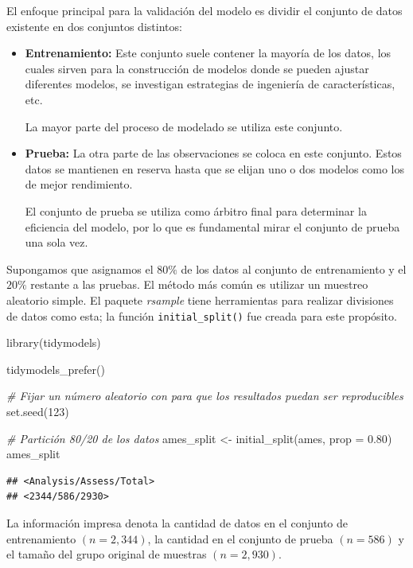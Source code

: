 \documentclass[
]{book}
\newenvironment{Shaded}{\begin{snugshade}}{\end{snugshade}}
\newcommand{\AttributeTok}[1]{\textcolor[rgb]{0.77,0.63,0.00}{#1}}
\newcommand{\CommentTok}[1]{\textcolor[rgb]{0.56,0.35,0.01}{\textit{#1}}}
\newcommand{\DecValTok}[1]{\textcolor[rgb]{0.00,0.00,0.81}{#1}}
\newcommand{\FloatTok}[1]{\textcolor[rgb]{0.00,0.00,0.81}{#1}}
\newcommand{\FunctionTok}[1]{\textcolor[rgb]{0.00,0.00,0.00}{#1}}
\newcommand{\NormalTok}[1]{#1}
\newcommand{\OtherTok}[1]{\textcolor[rgb]{0.56,0.35,0.01}{#1}}
\begin{document}
El enfoque principal para la validación del modelo es dividir el conjunto de datos existente en dos conjuntos distintos:

\begin{itemize}
\item
  \textbf{Entrenamiento:} Este conjunto suele contener la mayoría de los datos, los cuales
  sirven para la construcción de modelos donde se pueden ajustar diferentes modelos,
  se investigan estrategias de ingeniería de características, etc.

  La mayor parte del proceso de modelado se utiliza este conjunto.
\item
  \textbf{Prueba:} La otra parte de las observaciones se coloca en este conjunto.
  Estos datos se mantienen en reserva hasta que se elijan uno o dos modelos como los de mejor rendimiento.

  El conjunto de prueba se utiliza como árbitro final para determinar la eficiencia del modelo,
  por lo que es fundamental mirar el conjunto de prueba una sola vez.
\end{itemize}

Supongamos que asignamos el \(80\%\) de los datos al conjunto de entrenamiento y el \(20\%\) restante a las pruebas. El método más común es utilizar un muestreo aleatorio simple.
El paquete \emph{rsample} tiene herramientas para realizar divisiones de datos como esta;
la función \texttt{initial\_split()} fue creada para este propósito.

\begin{Shaded}
\begin{Highlighting}[]
\FunctionTok{library}\NormalTok{(tidymodels)}

\FunctionTok{tidymodels\_prefer}\NormalTok{()}

\CommentTok{\# Fijar un número aleatorio con para que los resultados puedan ser reproducibles }
\FunctionTok{set.seed}\NormalTok{(}\DecValTok{123}\NormalTok{)}

\CommentTok{\# Partición 80/20 de los datos}
\NormalTok{ames\_split }\OtherTok{\textless{}{-}} \FunctionTok{initial\_split}\NormalTok{(ames, }\AttributeTok{prop =} \FloatTok{0.80}\NormalTok{)}
\NormalTok{ames\_split}
\end{Highlighting}
\end{Shaded}

\begin{verbatim}
## <Analysis/Assess/Total>
## <2344/586/2930>
\end{verbatim}

La información impresa denota la cantidad de datos en el conjunto de entrenamiento
\((n = 2,344)\), la cantidad en el conjunto de prueba \((n = 586)\)
y el tamaño del grupo original de muestras \((n = 2,930)\).
\end{document}
